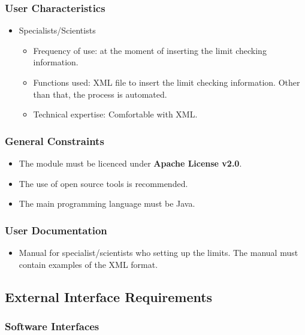 \subsubsection{User Characteristics}

\begin{itemize}
\item Specialists/Scientists
\begin{itemize}
\item Frequency of use: at the moment of inserting the limit checking information.
\item Functions used: XML file to insert the limit checking information. Other than that, the process is automated.
\item Technical expertise: Comfortable with XML.
\end{itemize}
\end{itemize}


\subsubsection{General Constraints}

\begin{itemize}
\item The module must be licenced under \textbf{Apache License v2.0}\cite{AL20}.
\item The use of open source tools is recommended.
\item The main programming language must be Java\cite{Java}.
\end{itemize}

\subsubsection{User Documentation}
\begin{itemize}
\item Manual for specialist/scientists who setting up the limits. The manual must contain examples of the XML format.
\end{itemize}

\subsection{External Interface Requirements}

\subsubsection{Software Interfaces}

